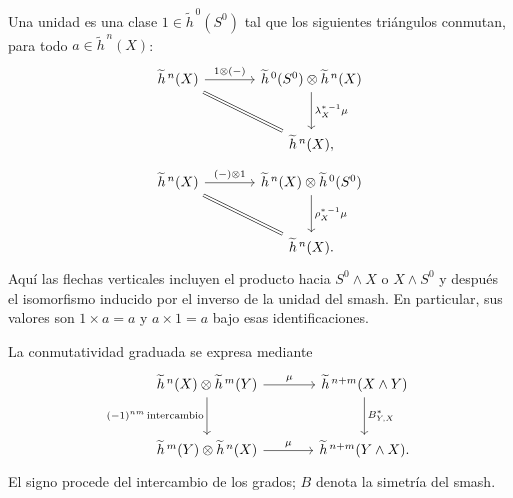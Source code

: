 Una unidad es una clase $1\in\widetilde h^{\,0}(S^0)$ tal que los siguientes triángulos conmutan, para todo $a\in\widetilde h^{\,n}(X)$:
\[
\begin{tikzcd}[column sep=large,row sep=large]
\widetilde h^{\,n}(X)\arrow[r,"1\otimes(-)"]\arrow[dr,equal]&
\widetilde h^{\,0}(S^0)\otimes\widetilde h^{\,n}(X)\arrow[d,"\lambda_X^{*\,-1}\mu"]\\
&\widetilde h^{\,n}(X),
\end{tikzcd}
\]
\[
\begin{tikzcd}[column sep=large,row sep=large]
\widetilde h^{\,n}(X)\arrow[r,"(-)\otimes1"]\arrow[dr,equal]&
\widetilde h^{\,n}(X)\otimes\widetilde h^{\,0}(S^0)\arrow[d,"\rho_X^{*\,-1}\mu"]\\
&\widetilde h^{\,n}(X).
\end{tikzcd}
\]
Aquí las flechas verticales incluyen el producto hacia $S^0\wedge X$ o $X\wedge S^0$ y después el isomorfismo inducido por el inverso de la unidad del smash. En particular, sus valores son $1\times a=a$ y $a\times1=a$ bajo esas identificaciones.

La conmutatividad graduada se expresa mediante
\[
\begin{tikzcd}[column sep=large,row sep=large]
\widetilde h^{\,n}(X)\otimes\widetilde h^{\,m}(Y)
 \arrow[r,"\mu"]\arrow[d,"(-1)^{nm}\,\mathrm{intercambio}"']&
\widetilde h^{\,n+m}(X\wedge Y)\arrow[d,"B_{Y,X}^{*}"]\\
\widetilde h^{\,m}(Y)\otimes\widetilde h^{\,n}(X)\arrow[r,"\mu"]&
\widetilde h^{\,n+m}(Y\wedge X).
\end{tikzcd}
\]
El signo procede del intercambio de los grados; $B$ denota la simetría del smash.

